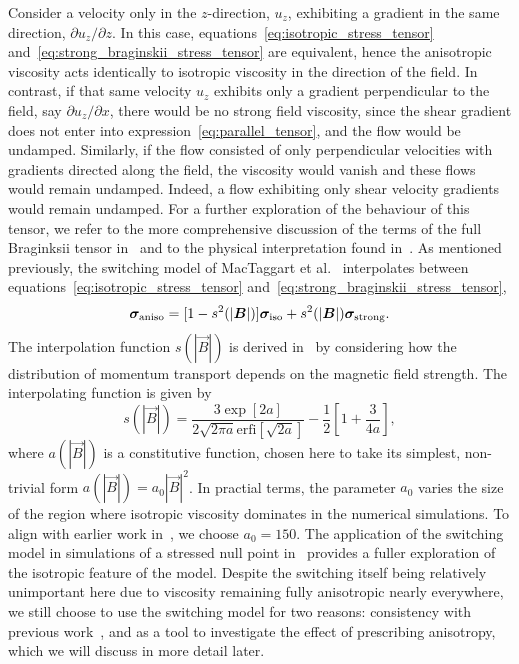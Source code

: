     Consider a velocity only in the $z$-direction, $u_z$, exhibiting a gradient in the same direction, $\partial u_z / \partial z$. In this case, equations~\eqref{eq:isotropic_stress_tensor} and~\eqref{eq:strong_braginskii_stress_tensor} are equivalent, hence the anisotropic viscosity acts identically to isotropic viscosity in the direction of the field. In contrast, if that same velocity $u_z$ exhibits only a gradient perpendicular to the field, say $\partial u_z / \partial x$, there would be no strong field viscosity, since the shear gradient does not enter into expression~\eqref{eq:parallel_tensor}, and the flow would be undamped. Similarly, if the flow consisted of only perpendicular velocities with gradients directed along the field, the viscosity would vanish and these flows would remain undamped. Indeed, a flow exhibiting only shear velocity gradients would remain undamped. For a further exploration of the behaviour of this tensor, we refer to the more comprehensive discussion of the terms of the full Braginksii tensor in~\cite{braginskiiTransportProcessesPlasma1965} and to the physical interpretation found in~\cite{hollwegViscosityMagnetizedPlasma1985}.
As mentioned previously, the switching model of MacTaggart et al.~\cite{mactaggartBraginskiiMagnetohydrodynamicsArbitrary2017} interpolates between equations~\eqref{eq:isotropic_stress_tensor} and~\eqref{eq:strong_braginskii_stress_tensor},
\begin{equation}
{\bm \sigma}_{\text{aniso}} = [1 - s^2(|{\bm B}|)]{\bm \sigma}_{\text{iso}} + s^2(|{\bm B}|){\bm \sigma}_{\text{strong}}.
\label{eq:switching_stress_tensor}
\end{equation}
The interpolation function $s(|\vec{B}|)$ is derived in~\cite{mactaggartBraginskiiMagnetohydrodynamicsArbitrary2017} by considering how the distribution of momentum transport depends on the magnetic field strength. The interpolating function is given by
\begin{equation}
s(|\vec{B}|) = \frac{3 \exp[2a]}{2\sqrt{2\pi a} \text{erfi}[\sqrt{2a}]} - \frac{1}{2}\left[ 1 + \frac{3}{4a} \right],
\label{eq:s-function}
\end{equation}
where $a(|\vec{B}|)$ is a constitutive function, chosen here to take its simplest, non-trivial form $a(|\vec{B}|) = a_0 |\vec{B}|^2$. In practial terms, the parameter $a_0$ varies the size of the region where isotropic viscosity dominates in the numerical simulations. To align with earlier work in~\cite{mactaggartBraginskiiMagnetohydrodynamicsArbitrary2017}, we choose $a_0 = 150$. The application of the switching model in simulations of a stressed null point in~\cite{mactaggartBraginskiiMagnetohydrodynamicsArbitrary2017} provides a fuller exploration of the isotropic feature of the model. Despite the switching itself being relatively unimportant here due to viscosity remaining fully anisotropic nearly everywhere, we still choose to use the switching model for two reasons: consistency with previous work~\cite{mactaggartBraginskiiMagnetohydrodynamicsArbitrary2017}, and as a tool to investigate the effect of prescribing anisotropy, which we will discuss in more detail later.

